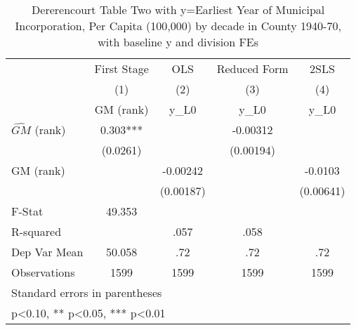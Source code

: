 \begin{table}[htbp]\centering
\def\sym#1{\ifmmode^{#1}\else\(^{#1}\)\fi}
\caption{Dererencourt Table Two with y=Earliest Year of Municipal Incorporation, Per Capita (100,000) by decade in County 1940-70, with baseline y and division FEs}
\begin{tabular}{l*{4}{c}}
\toprule
                    & First Stage   &         OLS   &Reduced Form   &        2SLS   \\
                    &\multicolumn{1}{c}{(1)}&\multicolumn{1}{c}{(2)}&\multicolumn{1}{c}{(3)}&\multicolumn{1}{c}{(4)}\\
                    &\multicolumn{1}{c}{GM  (rank)}&\multicolumn{1}{c}{y\_L0}&\multicolumn{1}{c}{y\_L0}&\multicolumn{1}{c}{y\_L0}\\
\midrule
$\hat{GM}$ (rank)   &       0.303***&               &    -0.00312   &               \\
                    &    (0.0261)   &               &   (0.00194)   &               \\
\addlinespace
GM  (rank)          &               &    -0.00242   &               &     -0.0103   \\
                    &               &   (0.00187)   &               &   (0.00641)   \\
\midrule
F-Stat              &      49.353   &               &               &               \\
R-squared           &               &        .057   &        .058   &               \\
Dep Var Mean        &      50.058   &         .72   &         .72   &         .72   \\
Observations        &        1599   &        1599   &        1599   &        1599   \\
\bottomrule
\multicolumn{5}{l}{\footnotesize Standard errors in parentheses}\\
\multicolumn{5}{l}{\footnotesize * p<0.10, ** p<0.05, *** p<0.01}\\
\end{tabular}
\end{table}
